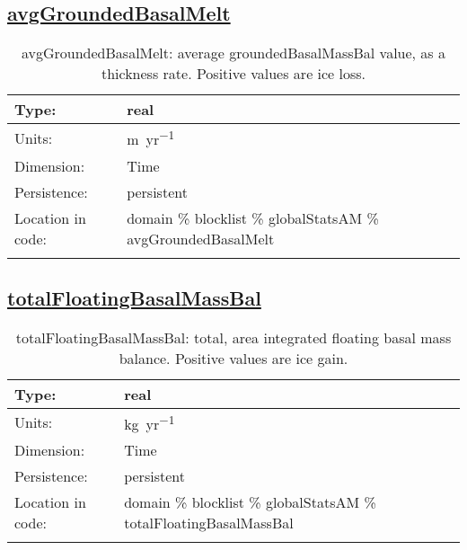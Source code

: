 \subsection[avgGroundedBasalMelt]{\hyperref[sec:var_tab_globalStatsAM]{avgGroundedBasalMelt}}
\label{subsec:var_sec_globalStatsAM_avgGroundedBasalMelt}
\begin{center}
\begin{longtable}{| p{2.0in} | p{4.0in} |}
        \hline 
        Type: & real \\
        \hline 
        Units: & \si{m.yr^{-1}} \\
        \hline 
        Dimension: & Time \\
        \hline 
        Persistence: & persistent \\
        \hline 
         Location in code: & domain \% blocklist \% globalStatsAM \% avgGroundedBasalMelt \\
         \hline 
    \caption{avgGroundedBasalMelt: average groundedBasalMassBal value, as a thickness rate. Positive values are ice loss.}
\end{longtable}
\end{center}
\subsection[totalFloatingBasalMassBal]{\hyperref[sec:var_tab_globalStatsAM]{totalFloatingBasalMassBal}}
\label{subsec:var_sec_globalStatsAM_totalFloatingBasalMassBal}
\begin{center}
\begin{longtable}{| p{2.0in} | p{4.0in} |}
        \hline 
        Type: & real \\
        \hline 
        Units: & \si{kg.yr^{-1}} \\
        \hline 
        Dimension: & Time \\
        \hline 
        Persistence: & persistent \\
        \hline 
         Location in code: & domain \% blocklist \% globalStatsAM \% totalFloatingBasalMassBal \\
         \hline 
    \caption{totalFloatingBasalMassBal: total, area integrated floating basal mass balance. Positive values are ice gain.}
\end{longtable}
\end{center}
